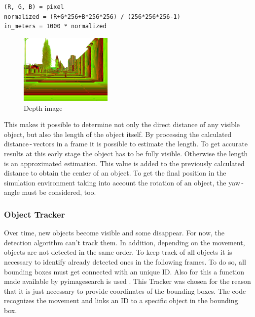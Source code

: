 \begin{lstlisting}[frame=single,basicstyle=\footnotesize]
(R, G, B) = pixel
normalized = (R+G*256+B*256*256) / (256*256*256-1)
in_meters = 1000 * normalized
\end{lstlisting}

\begin{figure}[h]
	\centering
	\includegraphics[width=0.4\textwidth]{images/depthimage.png}
	\caption{Depth image}
	\label{fig:depth image}
\end{figure}

This makes it possible to determine not only the direct distance of any visible object, but also the length of the object itself. By processing the calculated distance\,-\,vectors in a frame it is possible to estimate the length. To get accurate results at this early stage the object has to be fully visible. Otherwise the length is an approximated estimation. 
This value is added to the previously calculated distance to obtain the center of an object. To get the final position in the simulation environment taking into account the rotation of an object, the yaw\,-\,angle must be considered, too.\\


\subsubsection{Object Tracker}
Over time, new objects become visible and some disappear. For now, the detection algorithm can't track them. In addition, depending on the movement, objects are not detected in the same order. To keep track of all objects it is necessary to identify already detected ones in the following frames. To do so, all bounding boxes must get connected with an unique \ac{ID}. Also for this a function made available by pyimagesearch is used \cite{Tracker}. This Tracker was chosen for the reason that it is just necessary to provide coordinates of the bounding boxes. The code recognizes the movement and links an ID to a specific object in the bounding box.\\

